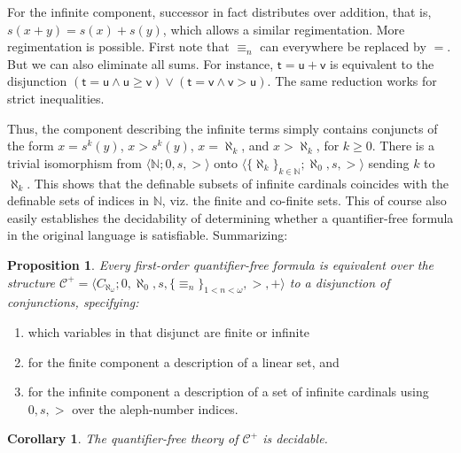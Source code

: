 \documentclass[12pt,oneside,reqno]{amsart}
\newtheorem{proposition}{Proposition}
\newtheorem{corollary}{Corollary}
\theoremstyle{definition}
\begin{document}
For the infinite component, successor in fact distributes over addition, that is, $s(x+y) = s(x)+s(y)$, which allows a similar regimentation. More regimentation is possible. First note that $\equiv_n$ can everywhere be replaced by $=$. But we can also eliminate all sums. For instance, $\mathsf{t}=\mathsf{u}+\mathsf{v}$ is equivalent to the disjunction $(\mathsf{t}=\mathsf{u} \wedge \mathsf{u}\geq \mathsf{v}) \vee (\mathsf{t}=\mathsf{v} \wedge \mathsf{v} > \mathsf{u})$. The same reduction works for strict inequalities. 

Thus, the component describing the infinite terms simply contains conjuncts of the form $x = s^k(y)$, $x>s^k(y)$, $x = \aleph_k$, and $x > \aleph_k$, for $k\geq 0$. %
There is a trivial isomorphism %
from $\langle \mathbb{N};0,s,> \rangle$ onto %
$\langle \{\aleph_k\}_{k \in \mathbb{N}};\aleph_0,s,>\rangle$ sending $k$ to $\aleph_k$. This shows that the definable subsets of infinite cardinals coincides with the definable sets of indices in $\mathbb{N}$, viz. the finite and co-finite sets. This of course also easily establishes the decidability of determining whether a quantifier-free formula in the original language is satisfiable. Summarizing:
\begin{proposition} \label{addition-normalform} Every first-order quantifier-free formula is equivalent over the structure $\mathcal{C}^+ = \langle C_{\aleph_\omega};0,\aleph_0,s,\{\equiv_n\}_{1<n<\omega},>,+\rangle$ to a disjunction of conjunctions, specifying:\end{proposition} \begin{enumerate}
    \item which variables in that disjunct are finite or infinite
    \item for the finite component a description of a linear set, and
    \item for the infinite component a description of a set of infinite cardinals using $0,s,>$ over the aleph-number indices. 
\end{enumerate}
\begin{corollary} The quantifier-free theory of $\mathcal{C}^+$ is decidable. 
\end{corollary}

\end{document}
